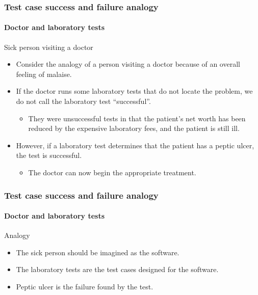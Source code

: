 \begin{frame}[hasprev=false, hasnext=true]
\frametitle{Test case success and failure analogy}
\framesubtitle{Doctor and laboratory tests}
\label{example:doctor-laboratory-test}

\begin{block}{Sick person visiting a doctor}
\begin{itemize}
	\item Consider the analogy of a person visiting a doctor because of an
	overall feeling of malaise.

	\item If the doctor runs some laboratory tests that do not locate the
	problem, we do not call the laboratory test ``successful''.
	\begin{itemize}
		\item They were unsuccessful tests in that the patient's net worth has
		been reduced by the expensive laboratory fees, and the patient is still
		ill.
	\end{itemize}

	\item However, if a laboratory test determines that the patient has a
	peptic ulcer, the test is successful.
	\begin{itemize}
		\item The doctor can now begin the appropriate treatment.
	\end{itemize}
\end{itemize}
\end{block}

\end{frame}


\begin{frame}[hasprev=true, hasnext=false]
	\frametitle{Test case success and failure analogy}
	\framesubtitle{Doctor and laboratory tests}

	\begin{block}{Analogy}
		\begin{itemize}
			\item The sick person should be imagined as the software.
			
			\item The laboratory tests are the test cases designed for the software.
			
			\item Peptic ulcer is the failure found by the test.
		\end{itemize}
	\end{block}
\end{frame}